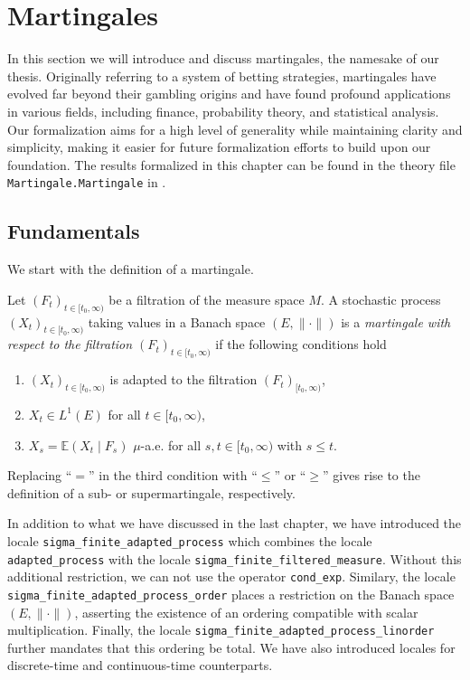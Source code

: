 
\chapter{Martingales}\label{chapter:martingales}

In this section we will introduce and discuss martingales, the namesake of our thesis. Originally referring to a system of betting strategies, martingales have evolved far beyond their gambling origins and have found profound applications in various fields, including finance, probability theory, and statistical analysis. Our formalization aims for a high level of generality while maintaining clarity and simplicity, making it easier for future formalization efforts to build upon our foundation. The results formalized in this chapter can be found in the theory file \texttt{Martingale.Martingale} in \cite{Keskin_A_Formalization_of_2023}.

\section{Fundamentals}

We start with the definition of a martingale.

\begin{definition}
	Let $(F_t)_{t \in [t_0,\infty)}$ be a filtration of the measure space $M$. A stochastic process $(X_t)_{t \in [t_0,\infty)}$ taking values in a Banach space $(E, \lVert \cdot \rVert)$ is a \textit{martingale with respect to the filtration $(F_t)_{t \in [t_0,\infty)}$} if the following conditions hold
	\begin{enumerate}
	\item $(X_t)_{t \in [t_0,\infty)}$ is adapted to the filtration $(F_t)_{[t_0,\infty)}$,
	\item $X_t \in L^1(E)$ for all $t \in [t_0, \infty)$,
	\item $X_s = \mathbb{E}(X_t \;\vert\; F_s)$ $\mu$-a.e. for all $s,t \in [t_0,\infty)$ with $s \le t$.
	\end{enumerate}
	Replacing ``$=$'' in the third condition with ``$\le$'' or ``$\ge$'' gives rise to the definition of a sub- or supermartingale, respectively.
\end{definition}

\begin{remark}
 In addition to what we have discussed in the last chapter, we have introduced the locale \texttt{sigma\_finite\_adapted\_process} which combines the locale \texttt{adapted\_process} with the locale \texttt{sigma\_finite\_filtered\_measure}. Without this additional restriction, we can not use the operator \texttt{cond\_exp}. Similary, the locale  \texttt{sigma\_finite\_adapted\_pro\-cess\-\_order} places a restriction on the Banach space $(E, \lVert \cdot \rVert)$, asserting the existence of an ordering compatible with scalar multiplication. Finally, the locale \texttt{sigma\_finite\_adap\-ted\-\_process\_linorder} further mandates that this ordering be total. We have also introduced locales for discrete-time and continuous-time counterparts.
\end{remark}

